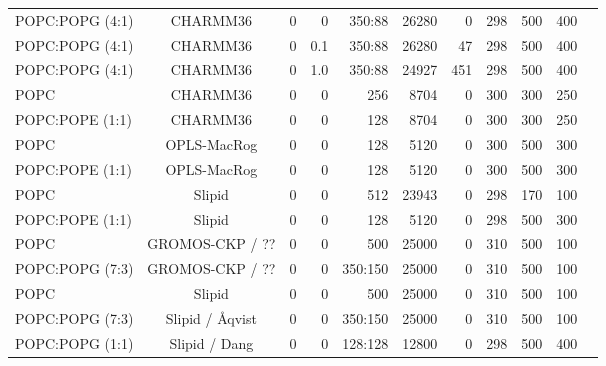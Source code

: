 \documentclass[journal=jpcbfk]{achemso}
\begin{document}
\begin{table}[htb]
\begin{minipage}[t]{\textwidth}
{\begin{tabular}{l c c r r r r r r c c}
      POPC:POPG (4:1)        & CHARMM36 \cite{klauda10,venable13}        &0          & 0  & 350:88 & 26280 & 0  &  298  & 500 & 400 & \cite{CHARMM36POPCPOPG4010} \\
      POPC:POPG (4:1)        & CHARMM36 \cite{klauda10,venable13}        &0          & 0.1 & 350:88 & 26280 & 47  &  298  & 500 & 400 & \cite{CHARMM36POPCPOPG4010100mMCaCl} \\
      POPC:POPG (4:1)        & CHARMM36 \cite{klauda10,venable13}        &0          & 1.0 & 350:88 & 24927 & 451  &  298  & 500 & 400 & \cite{CHARMM36POPCPOPG40101000mMCaCl} \\
      \hline
      POPC             & CHARMM36 \cite{klauda10}        &0          & 0  & 256 & 8704 & 0  &  300  & 300 & 250 & \cite{POPCcharmm300K} \\
      POPC:POPE (1:1)  & CHARMM36 \cite{klauda10,venable13}        &0          & 0  & 128 & 8704 & 0  &  300  & 300 & 250 & \cite{POPC1POPE1charmm36} \\
      \hline
      POPC             & OPLS-MacRog \cite{rog16}     &0          & 0  & 128 & 5120 & 0  &  300  & 500 & 300 & \cite{POPCmacrog300K} \\
      POPC:POPE (1:1)  & OPLS-MacRog \cite{rog16}     &0          & 0  & 128 & 5120 & 0  &  300  & 500 & 300 & \cite{POPC1POPE1macrogT300K} \\
      \hline
      POPC             & Slipid \cite{jambeck12b}     &0          & 0  & 512 & 23943 & 0  &  298  & 170 & 100 & \cite{POPCslipid298K} \\
      POPC:POPE (1:1)  & Slipid \cite{jambeck12b}     &0          & 0  & 128 & 5120  & 0  &  298  & 500 & 300 & \cite{POPC1POPE1slipidT298K} \\
     \hline
      POPC                   & GROMOS-CKP / ?? \cite{??,??}  & 0         & 0  & 500     & 25000 & 0   &  310  & 500 & 100 & \cite{POPCgromosCKPT310K}  \\
      POPC:POPG (7:3)        & GROMOS-CKP / ?? \cite{??,??}  & 0         & 0  & 350:150 & 25000 & 0   &  310  & 500 & 100 & \cite{POPC7POPG3gromosCKPT310K} \\
     \hline
      POPC                   & Slipid \cite{jambeck12b}  & 0         & 0  & 500     & 25000 & 0   &  310  & 500 & 100 & \cite{POPCslipid301K}  \\
      POPC:POPG (7:3)        & Slipid / {\AA}qvist \cite{jambeck12b,aqvist90}  & 0         & 0  & 350:150 & 25000 & 0   &  310  & 500 & 100 & \cite{slipidPOPC70POPG30T310K} \\
      POPC:POPG (1:1)        & Slipid / Dang \cite{jambeck12b,jambeck2012another,smith94,dang06} & 0         & 0  & 128:128 & 12800 & 0   &  298  & 500 & 400 & \cite{slipidPOPC50POPG50T298K} \\

\end{tabular}}
\end{minipage}
\end{table}
\end{document}
